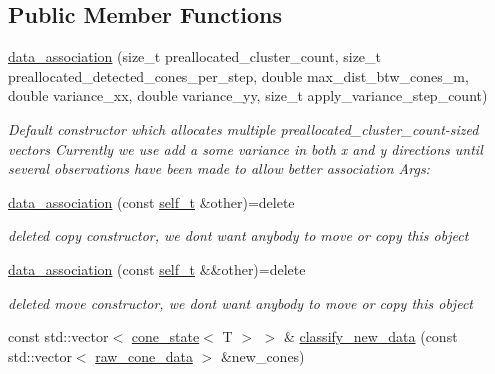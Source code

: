 \subsection*{Public Member Functions}
\begin{DoxyCompactItemize}
\item 
\hyperlink{classclara_1_1data__association_aea67f1fd9ae7d96f7dd502774fc45828}{data\+\_\+association} (size\+\_\+t preallocated\+\_\+cluster\+\_\+count, size\+\_\+t preallocated\+\_\+detected\+\_\+cones\+\_\+per\+\_\+step, double max\+\_\+dist\+\_\+btw\+\_\+cones\+\_\+m, double variance\+\_\+xx, double variance\+\_\+yy, size\+\_\+t apply\+\_\+variance\+\_\+step\+\_\+count)
\begin{DoxyCompactList}\small\item\em Default constructor which allocates multiple preallocated\+\_\+cluster\+\_\+count-\/sized vectors Currently we use add a some variance in both x and y directions until several observations have been made to allow better association Args\+: \end{DoxyCompactList}\item 
\mbox{\label{classclara_1_1data__association_ad2c91ace8a61fa96a922dd588edc5088}} 
\hyperlink{classclara_1_1data__association_ad2c91ace8a61fa96a922dd588edc5088}{data\+\_\+association} (const \hyperlink{classclara_1_1data__association_a3d00cd85107ac291ba6e3ec5fcec2ff0}{self\+\_\+t} \&other)=delete
\begin{DoxyCompactList}\small\item\em deleted copy constructor, we don\textquotesingle{}t want anybody to move or copy this object \end{DoxyCompactList}\item 
\mbox{\label{classclara_1_1data__association_a4aeffb04c5b2fc9c2610a4c763e720a1}} 
\hyperlink{classclara_1_1data__association_a4aeffb04c5b2fc9c2610a4c763e720a1}{data\+\_\+association} (const \hyperlink{classclara_1_1data__association_a3d00cd85107ac291ba6e3ec5fcec2ff0}{self\+\_\+t} \&\&other)=delete
\begin{DoxyCompactList}\small\item\em deleted move constructor, we don\textquotesingle{}t want anybody to move or copy this object \end{DoxyCompactList}\item 
const std\+::vector$<$ \hyperlink{classclara_1_1cone__state}{cone\+\_\+state}$<$ T $>$ $>$ \& \hyperlink{classclara_1_1data__association_a4e03c0b8425a004866c059283be5eeef}{classify\+\_\+new\+\_\+data} (const std\+::vector$<$ \hyperlink{classclara_1_1data__association_a8232de58bbfc0b4897e4efa62ca97ccc}{raw\+\_\+cone\+\_\+data} $>$ \&new\+\_\+cones)

\end{DoxyCompactItemize}
